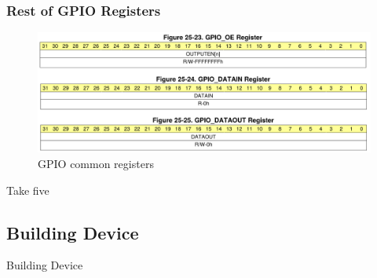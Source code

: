 \documentclass[aspectratio=169,usenames,dvipsnames]{beamer}
\begin{document}
\begin{frame}
  \frametitle{Rest of GPIO Registers}
    \begin{figure}
      \centering
      \includegraphics[scale=0.3]{images/gpio-common-regs.png}
      \caption{GPIO common registers}
  \end{figure}
\end{frame}

\begin{frame}[standout]
  Take five
\end{frame}

\subsection{Building Device}

\begin{frame}[standout]
  Building Device
\end{frame}
\end{document}
